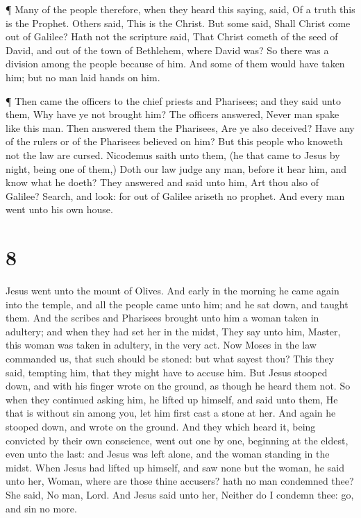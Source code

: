  ¶ Many of the people therefore, when they heard this
saying, said, Of a truth this is the Prophet.  Others said,
This is the Christ. But some said, Shall Christ come out of Galilee?
 Hath not the scripture said, That Christ cometh of the
seed of David, and out of the town of Bethlehem, where David was?
 So there was a division among the people because of him.
 And some of them would have taken him; but no man laid
hands on him.

 ¶ Then came the officers to the chief priests and
Pharisees; and they said unto them, Why have ye not brought him?
 The officers answered, Never man spake like this man.
 Then answered them the Pharisees, Are ye also deceived?
 Have any of the rulers or of the Pharisees believed on
him?  But this people who knoweth not the law are cursed.
 Nicodemus saith unto them, (he that came to Jesus by
night, being one of them,)  Doth our law judge any man,
before it hear him, and know what he doeth?  They answered
and said unto him, Art thou also of Galilee? Search, and look: for out
of Galilee ariseth no prophet.  And every man went unto his
own house.

\hypertarget{section-7}{%
\section{8}\label{section-7}}

 Jesus went unto the mount of Olives.  And early
in the morning he came again into the temple, and all the people came
unto him; and he sat down, and taught them.  And the scribes
and Pharisees brought unto him a woman taken in adultery; and when they
had set her in the midst,  They say unto him, Master, this
woman was taken in adultery, in the very act.  Now Moses in
the law commanded us, that such should be stoned: but what sayest thou?
 This they said, tempting him, that they might have to
accuse him. But Jesus stooped down, and with his finger wrote on the
ground, as though he heard them not.  So when they continued
asking him, he lifted up himself, and said unto them, He that is without
sin among you, let him first cast a stone at her.  And again
he stooped down, and wrote on the ground.  And they which
heard it, being convicted by their own conscience, went out one by one,
beginning at the eldest, even unto the last: and Jesus was left alone,
and the woman standing in the midst.  When Jesus had lifted
up himself, and saw none but the woman, he said unto her, Woman, where
are those thine accusers? hath no man condemned thee?  She
said, No man, Lord. And Jesus said unto her, Neither do I condemn thee:
go, and sin no more.

